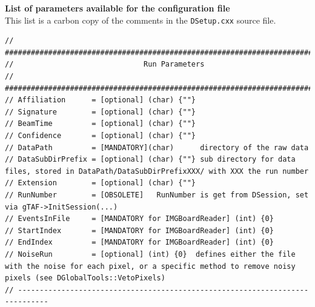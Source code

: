 \documentclass[a4paper, 12pt, twoside]{article}
\begin{document}
\noindent
{\bf List of parameters available for the configuration file}\\

\noindent
This list is a carbon copy of the comments in the {\tt DSetup.cxx} source file.

\begin{verbatim}
// #############################################################################
//                              Run Parameters 
// #############################################################################
// Affiliation      = [optional] (char) {""}
// Signature        = [optional] (char) {""}
// BeamTime         = [optional] (char) {""}
// Confidence       = [optional] (char) {""}
// DataPath         = [MANDATORY](char)      directory of the raw data
// DataSubDirPrefix = [optional] (char) {""} sub directory for data files, stored in DataPath/DataSubDirPrefixXXX/ with XXX the run number
// Extension        = [optional] (char) {""}   
// RunNumber        = [OBSOLETE]   RunNumber is get from DSession, set via gTAF->InitSession(...)
// EventsInFile     = [MANDATORY for IMGBoardReader] (int) {0}
// StartIndex       = [MANDATORY for IMGBoardReader] (int) {0}
// EndIndex         = [MANDATORY for IMGBoardReader] (int) {0}
// NoiseRun         = [optional] (int) {0}  defines either the file with the noise for each pixel, or a specific method to remove noisy pixels (see DGlobalTools::VetoPixels)
// -----------------------------------------------------------------------------


\end{verbatim}
\end{document}
